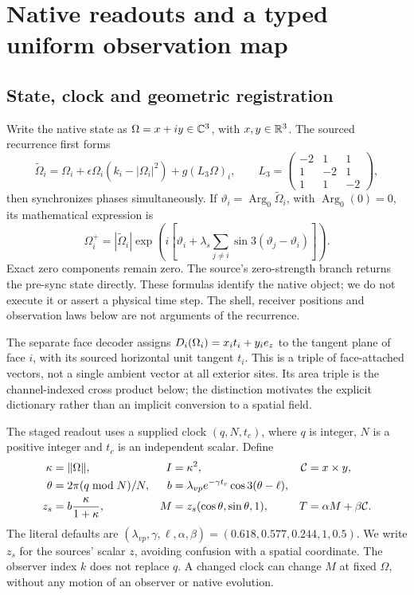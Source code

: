 \section{Native readouts and a typed uniform observation map}\label{sec:uniform}
\subsection{State, clock and geometric registration}
Write the native state as $\Omega=x+iy\in\mathbb C^3$, with $x,y\in\mathbb R^3$. The sourced recurrence first forms
\begin{equation}\label{eq:native}
\widetilde\Omega_i=\Omega_i+\epsilon\Omega_i(k_i-|\Omega_i|^2)
+g(L_3\Omega)_i,\qquad
L_3=\begin{pmatrix}-2&1&1\\1&-2&1\\1&1&-2\end{pmatrix},
\end{equation}
then synchronizes phases simultaneously. If $\vartheta_i=\operatorname{Arg}_0\widetilde\Omega_i$, with $\operatorname{Arg}_0(0)=0$, its mathematical expression is
\begin{equation}\label{eq:sync}
\Omega_i^+=|\widetilde\Omega_i|\exp\!\left(i\left[\vartheta_i+\lambda_s
\sum_{j\ne i}\sin3(\vartheta_j-\vartheta_i)\right]\right).
\end{equation}
Exact zero components remain zero. The source's zero-strength branch returns the pre-sync state directly. These formulas identify the native object; we do not execute it or assert a physical time step. The shell, receiver positions and observation laws below are not arguments of the recurrence.~\cite{Native}

The separate face decoder assigns $D_i(\Omega_i)=x_i t_i+y_ie_z$ to the tangent plane of face $i$, with its sourced horizontal unit tangent $t_i$. This is a triple of face-attached vectors, not a single ambient vector at all exterior sites. Its area triple is the channel-indexed cross product below; the distinction motivates the explicit dictionary rather than an implicit conversion to a spatial field.~\cite{Native}

The staged readout uses a supplied clock $(q,N,t_c)$, where $q$ is integer, $N$ is a positive integer and $t_c$ is an independent scalar. Define
\begin{equation}\label{eq:staged}
\begin{aligned}
\kappa&=\lVert\Omega\rVert,& I&=\kappa^2,&\mathcal C&=x\times y,\\
\theta&=2\pi(q\bmod N)/N,&
b&=\lambda_{vp}e^{-\gamma t_c}\cos3(\theta-\ell),\\
z_s&=b\frac{\kappa}{1+\kappa},&
M&=z_s(\cos\theta,\sin\theta,1),&T&=\alpha M+\beta\mathcal C.
\end{aligned}
\end{equation}
The literal defaults are $(\lambda_{vp},\gamma,\ell,\alpha,\beta)=(0.618,0.577,0.244,1,0.5)$. We write $z_s$ for the sources' scalar $z$, avoiding confusion with a spatial coordinate. The observer index $k$ does not replace $q$. A changed clock can change $M$ at fixed $\Omega$, without any motion of an observer or native evolution.~\cite{Readout}

